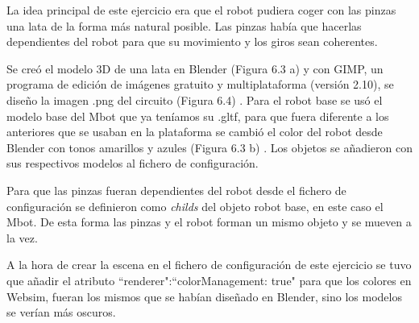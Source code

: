 La idea principal de este ejercicio era que el robot pudiera coger con las pinzas una lata de la forma más natural posible. Las pinzas había que hacerlas dependientes del robot para que su movimiento y los giros sean coherentes. 

Se creó el modelo 3D de una lata en Blender (Figura 6.3 a) y con  GIMP, un programa de edición de imágenes gratuito y multiplataforma (versión 2.10), se diseño la imagen .png del circuito (Figura 6.4) . Para el robot base se usó el modelo base del Mbot que ya teníamos su  .gltf, para que fuera diferente a los anteriores que se usaban en la plataforma se cambió el color del robot desde Blender con tonos amarillos y azules (Figura 6.3 b) .
Los objetos se añadieron con sus respectivos modelos al fichero de configuración.

Para que las pinzas fueran dependientes del robot desde el fichero de configuración se definieron como \textit{childs} del objeto robot base, en este caso el Mbot. De esta forma las pinzas y el robot forman un mismo objeto y se mueven a la vez.

A la hora de crear la escena en el fichero de configuración de este ejercicio se tuvo que añadir el atributo ``renderer":``colorManagement: true"  para que los colores en Websim, fueran los mismos que se habían diseñado en Blender, sino los modelos se verían más oscuros. 

